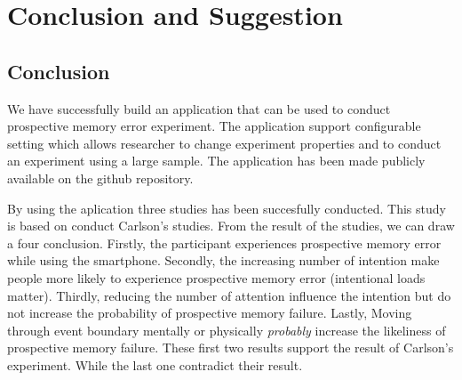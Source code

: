 \chapter{Conclusion and Suggestion}
\section{Conclusion}


We have successfully build an application that can be used to conduct prospective memory error experiment.
The application support configurable setting which allows researcher to change experiment properties and to conduct
an experiment using a large sample. The application has been made publicly available on the github repository.

By using the aplication three studies has been succesfully conducted.
This study is based on conduct Carlson's studies. From the result of the studies,
we can draw a four conclusion. Firstly, the participant experiences prospective memory error while using the smartphone.
Secondly, the increasing number of intention make people more likely to experience prospective memory error (intentional loads matter).
Thirdly, reducing the number of attention influence the intention but do not increase the probability of prospective memory failure.
Lastly, Moving through event boundary mentally or physically \textit{probably} increase the likeliness of prospective memory failure.
These first two results support the result of Carlson's experiment. While the last one
contradict their result.

